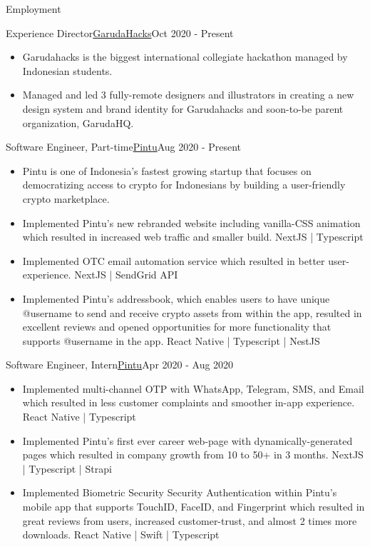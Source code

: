 \documentclass[]{mcdowellcv}
\begin{document}
	\begin{cvsection}{Employment}
		\begin{cvsubsection}{Experience Director}{\href{https://garudahacks.com/}{GarudaHacks}}{Oct 2020 - Present}
			\begin{itemize}
				\item Garudahacks is the biggest international collegiate hackathon managed by Indonesian students.
				\item Managed and led 3 fully-remote designers and illustrators in creating a new design system and brand identity for Garudahacks and soon-to-be parent organization, GarudaHQ.
			\end{itemize}
		\end{cvsubsection}

		\begin{cvsubsection}{Software Engineer, Part-time}{\href{https://pintu.co.id/}{Pintu}}{Aug 2020 - Present}
			\begin{itemize}
				\item Pintu is one of Indonesia's fastest growing startup that focuses on democratizing access to crypto for Indonesians by building a user-friendly crypto marketplace.
				\item Implemented Pintu's new rebranded website including vanilla-CSS animation which resulted in increased web traffic and smaller build. NextJS | Typescript
				\item Implemented OTC email automation service which resulted in better user-experience. NextJS | SendGrid API
				\item Implemented Pintu's addressbook, which enables users to have unique @username to send and receive crypto assets from within the app, resulted in excellent reviews and opened opportunities for more functionality that supports @username in the app. React Native | Typescript | NestJS
			\end{itemize}
		\end{cvsubsection}
		
		
		\begin{cvsubsection}{Software Engineer, Intern}{\href{https://pintu.co.id/}{Pintu}}{Apr 2020 - Aug 2020}
			\begin{itemize}
				\item Implemented multi-channel OTP with WhatsApp, Telegram, SMS, and Email which resulted in less customer complaints and smoother in-app experience. React Native | Typescript
				\item Implemented Pintu's first ever career web-page with dynamically-generated pages which resulted in company growth from 10 to 50+ in 3 months. NextJS | Typescript | Strapi
				\item Implemented Biometric Security Security Authentication within Pintu's mobile app that supports TouchID, FaceID, and Fingerprint which resulted in great reviews from users, increased customer-trust, and almost 2 times more downloads. React Native | Swift | Typescript
			\end{itemize}
		\end{cvsubsection}


\end{cvsection}
\end{document}

